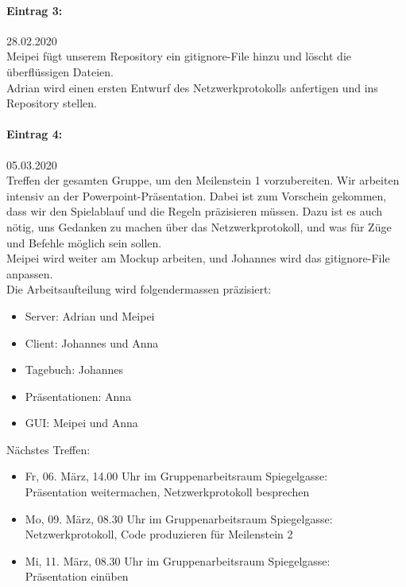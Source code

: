 \documentclass[12pt]{article}
\begin{document}
\paragraph{Eintrag 3:}
28.02.2020\\
Meipei f\"ugt unserem Repository ein gitignore-File hinzu und l\"oscht die überflüssigen Dateien.\\
Adrian wird einen ersten Entwurf des Netzwerkprotokolls anfertigen und ins Repository stellen.

\paragraph{Eintrag 4:}
05.03.2020\\
Treffen der gesamten Gruppe, um den Meilenstein 1 vorzubereiten. Wir arbeiten intensiv an der Powerpoint-Pr\"asentation. Dabei ist zum Vorschein gekommen, dass wir den Spielablauf und die Regeln pr\"azisieren m\"ussen. Dazu ist es auch n\"otig, uns Gedanken zu machen \"uber das Netzwerkprotokoll, und was f\"ur Z\"uge und Befehle m\"oglich sein sollen.\\
Meipei wird weiter am Mockup arbeiten, und Johannes wird das gitignore-File anpassen.\\
Die Arbeitsaufteilung wird folgendermassen pr\"azisiert:
\begin{itemize}
\item Server: Adrian und Meipei
\item Client: Johannes und Anna
\item Tagebuch: Johannes
\item Pr\"asentationen: Anna
\item GUI: Meipei und Anna\\
\end{itemize}

\noindent N\"achstes Treffen:
\begin{itemize}
\item Fr, 06. M\"arz, 14.00 Uhr im Gruppenarbeitsraum Spiegelgasse:\\
Pr\"asentation weitermachen, Netzwerkprotokoll besprechen
\item Mo, 09. M\"arz, 08.30 Uhr im Gruppenarbeitsraum Spiegelgasse:\\
Netzwerkprotokoll, Code produzieren f\"ur Meilenstein 2
\item Mi, 11. M\"arz, 08.30 Uhr im Gruppenarbeitsraum Spiegelgasse:\\
Pr\"asentation ein\"uben
\end{itemize}
\end{document}
